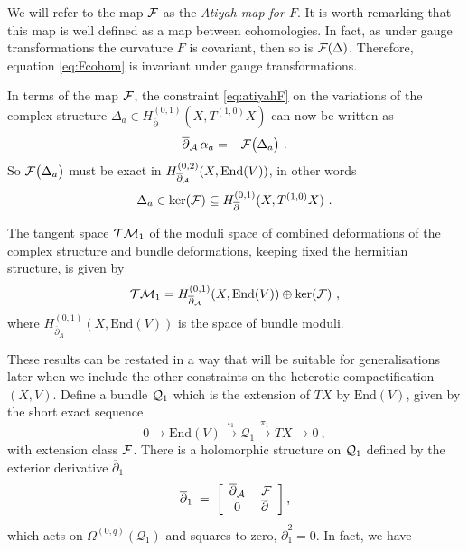 \documentclass[12pt,a4paper]{article}
\def\bar#1{\overline{#1}}
\def\End{\textrm{End}}
\def\ker{\textrm{ker}}
\def\bp{\bar{\partial}}
\def\Q{\mathcal{Q}}
\theoremstyle{definition}
\begin{document}
\vskip10pt
\noindent We will refer to the map $\cal F$ as the {\it Atiyah map for $F$}.  It is worth remarking that this map is well defined as a map between cohomologies.  In fact, as under gauge transformations the curvature $F$ is covariant, then so  is ${\cal F}(\Delta)$.  Therefore, equation \eqref{eq:Fcohom} is invariant under gauge transformations.
\vskip5pt

In terms of the map $\cal F$, the constraint \eqref{eq:atiyahF} on the variations of the complex structure 
$\Delta _a\in H_{\bp}^{(0,1)}(X,T^{(1,0)}X)$
can now be written as
\begin{equation}
 \bar\partial_{\cal A}\,\alpha_a = - {\cal F}\big(\Delta_a\big)~.\label{eq:atiyahFbis}
 \end{equation}
So  ${\cal F}\big(\Delta_a\big)$ must be exact in $H_{\bp_{\cal A}}^{(0,2)}(X,\End(V))$, in other words
\[ \Delta _a\in \ker({\cal F})\subseteq H_{\bp}^{(0,1)}(X,T^{(1,0)}X)~.\]

The tangent space ${\cal TM}_1$ of the moduli space of combined deformations of the complex structure and bundle deformations, keeping fixed the hermitian structure, is given by
\begin{equation}
{\cal TM}_1= H_{\bp_{\cal A}}^{(0,1)}(X,\End(V))\oplus \ker({\cal F})~ ,\label{eq:M1}
\end{equation}
where $H_{\bp_A}^{(0,1)}(X,\End(V))$ is the space of bundle moduli. 

These results can be restated in a way that will be suitable for generalisations later when we include the other constraints on the heterotic compactification $(X,V)$.  Define a bundle ${\cal Q}_1$ which is the extension of $TX$ by $\End(V)$, given by the short exact sequence
  \begin{equation}
   0\rightarrow \End(V)\xrightarrow{\iota_1} \Q_1 \xrightarrow{\pi_1} TX \rightarrow 0~,   \label{eq:ses1}\end{equation}
 with extension class $\cal F$.
 There is a holomorphic structure on ${\cal Q}_1$ defined by the exterior derivative $\bar\partial_1$ 
 \begin{equation*}
\bp_1\;=\; \left[ \begin{array}{cc}
\bp_{\cal A} & \;{\cal F} \\
0  & \bp  \end{array} \right],
\end{equation*}
which acts on $\Omega^{(0,q)}(\Q_1)$ and squares to zero, $\bp_1^2 = 0$.  In fact, we have
\end{document}
